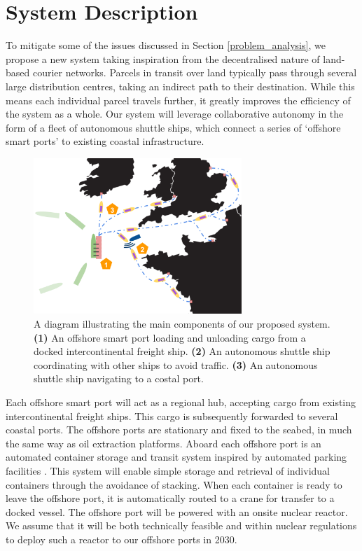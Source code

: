 \section{System Description}
To mitigate some of the issues discussed in Section \ref{problem_analysis}, we propose a new system taking inspiration from the decentralised nature of land-based courier networks. Parcels in transit over land typically pass through several large distribution centres, taking an indirect path to their destination. While this means each individual parcel travels further, it greatly improves the efficiency of the system as a whole. Our system will leverage collaborative autonomy in the form of a fleet of autonomous shuttle ships, which connect a series of `offshore smart ports’ to existing coastal infrastructure.

\begin{figure}[h!]
\begin{center}
\vspace{0.4cm}
\includegraphics[width=0.7\textwidth]{images/map.png}	
\vspace{0.4cm}
\end{center}
\caption{ A diagram illustrating the main components of our proposed system. \textbf{(1)} An offshore smart port loading and unloading cargo from a docked intercontinental freight ship. \textbf{(2)} An autonomous shuttle ship coordinating with other ships to avoid traffic. \textbf{(3)} An autonomous shuttle ship navigating to a costal port. }
\label{map}	
\end{figure}


Each offshore smart port will act as a regional hub, accepting cargo from existing intercontinental freight ships. This cargo is subsequently forwarded to several coastal ports. The offshore ports are stationary and fixed to the seabed, in much the same way as oil extraction platforms. Aboard each offshore port is an automated container storage and transit system inspired by automated parking facilities \cite{Mathijssen2007}. This system will enable simple storage and retrieval of individual containers through the avoidance of stacking. When each container is ready to leave the offshore port, it is automatically routed to a crane for transfer to a docked vessel. The offshore port will be powered with an onsite nuclear reactor. We assume that it will be both technically feasible and within nuclear regulations to deploy such a reactor to our offshore ports in 2030.


